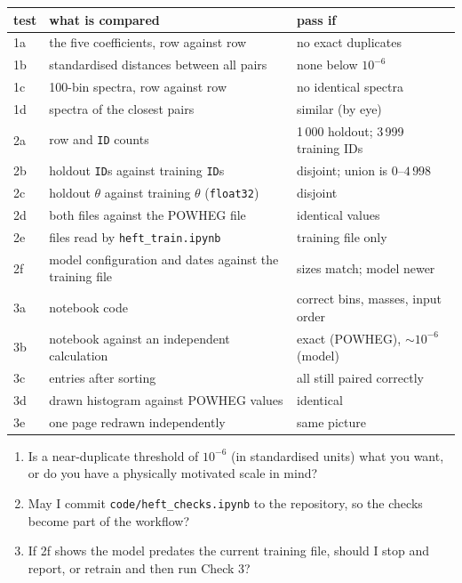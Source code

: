 \documentclass[11pt]{article}
\newcommand{\file}[1]{\nolinkurl{#1}}
\newcommand{\code}[1]{\texttt{#1}}
\begin{document}
\begin{center}
\small
\begin{tabular}{lll}
\toprule
test & what is compared & pass if\\
\midrule
1a & the five coefficients, row against row & no exact duplicates\\
1b & standardised distances between all pairs & none below $10^{-6}$\\
1c & 100-bin spectra, row against row & no identical spectra\\
1d & spectra of the closest pairs & similar (by eye)\\
\midrule
2a & row and \code{ID} counts & 1\,000 holdout; 3\,999 training IDs\\
2b & holdout \code{ID}s against training \code{ID}s & disjoint; union is $0$--$4\,998$\\
2c & holdout $\theta$ against training $\theta$ (\code{float32}) & disjoint\\
2d & both files against the POWHEG file & identical values\\
2e & files read by \code{heft\_train.ipynb} & training file only\\
2f & model configuration and dates against the training file & sizes match; model newer\\
\midrule
3a & notebook code & correct bins, masses, input order\\
3b & notebook against an independent calculation & exact (POWHEG), $\sim10^{-6}$ (model)\\
3c & entries after sorting & all still paired correctly\\
3d & drawn histogram against POWHEG values & identical\\
3e & one page redrawn independently & same picture\\
\bottomrule
\end{tabular}
\end{center}

\begin{keyidea}
\begin{enumerate}
  \item Is a near-duplicate threshold of $10^{-6}$ (in standardised units) what
  you want, or do you have a physically motivated scale in mind?
  \item May I commit \file{code/heft_checks.ipynb} to the repository, so the
  checks become part of the workflow?
  \item If 2f shows the model predates the current training file, should I stop
  and report, or retrain and then run Check 3?
\end{enumerate}
\end{keyidea}
\end{document}
